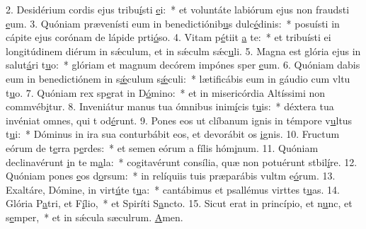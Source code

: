 2. Desidérium cordis ejus tribu\uline{í}sti \uline{e}i:~* et voluntáte labiórum ejus non fraudsti \uline{e}um.
3. Quóniam prævenísti eum in benedictiónib\uline{u}s dulc\uline{é}dinis:~* posuísti in cápite ejus corónam de lápide prti\uline{ó}so.
4. Vitam p\uline{é}tiit \uline{a} te:~* et tribuísti ei longitúdinem diérum in sǽculum, et in sǽculm sǽc\uline{u}li.
5. Magna est glória ejus in salut\uline{á}ri t\uline{u}o:~* glóriam et magnum decórem impónes sper \uline{e}um.
6. Quóniam dabis eum in benedictiónem in s\uline{ǽ}culum s\uline{ǽ}culi:~* lætificábis eum in gáudio cum vltu t\uline{u}o.
7. Quóniam rex sp\uline{e}rat in D\uline{ó}mino:~* et in misericórdia Altíssimi non commvéb\uline{i}tur.
8. Inveniátur manus tua ómnibus inim\uline{í}cis t\uline{u}is:~* déxtera tua invéniat omnes, qui t od\uline{é}runt.
9. Pones eos ut clíbanum ignis in témpore v\uline{u}ltus t\uline{u}i:~* Dóminus in ira sua conturbábit eos, et devorábit os \uline{i}gnis.
10. Fructum eórum de t\uline{e}rra p\uline{e}rdes:~* et semen eórum a fílis hóm\uline{i}num.
11. Quóniam declinavérunt \uline{i}n te m\uline{a}la:~* cogitavérunt consília, quæ non potuérunt stbil\uline{í}re.
12. Quóniam pones \uline{e}os d\uline{o}rsum:~* in relíquiis tuis præparábis vultm e\uline{ó}rum.
13. Exaltáre, Dómine, in virt\uline{ú}te t\uline{u}a:~* cantábimus et psallémus virttes t\uline{u}as.
14. Glória P\uline{a}tri, et F\uline{í}lio,~* et Spiríti S\uline{a}ncto.
15. Sicut erat in princípio, et n\uline{u}nc, et s\uline{e}mper,~* et in sǽcula sæculrum. \uline{A}men.
